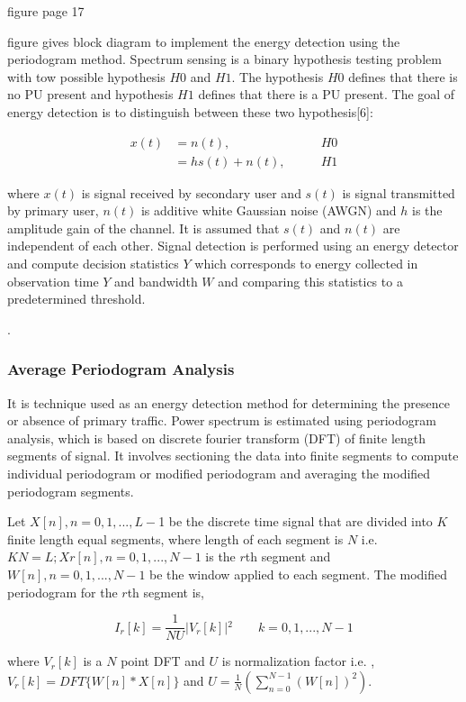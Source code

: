 figure page 17




figure gives block diagram to implement the energy detection using the periodogram method. Spectrum sensing is a binary hypothesis testing problem with tow possible hypothesis $H0$ and $H1$. The hypothesis $H0$ defines that there is no PU present and hypothesis $H1$ defines that there is a PU present. The goal of energy detection is to distinguish between these two hypothesis[6]:

\begin{align}
	x(t) &= n(t), \qquad & H0 \nonumber\\
		&= h s(t)+n(t), \qquad & H1 \nonumber
\end{align}

where $x(t)$ is signal received by secondary user and $s(t)$ is signal transmitted by primary user, $n(t)$ is additive white Gaussian noise (AWGN) and $h$ is the amplitude gain of the channel. It is assumed that $s(t)$  and $n(t)$ are independent of each other. Signal detection is performed using an energy detector and compute decision statistics $Y$ which corresponds to energy collected in observation time $Y$ and bandwidth $W$ and comparing this statistics to a predetermined threshold. 

.
\subsubsection{Average Periodogram Analysis}
 It is technique used as an energy detection method for determining the presence or absence of primary traffic. 
Power spectrum is estimated using periodogram analysis, which is based on discrete fourier transform (DFT) of finite length segments of signal. It involves sectioning the data into finite segments to compute individual periodogram or modified periodogram and averaging the modified periodogram segments.


Let $X[n], n=0,1,...,L-$1 be the discrete time signal that are divided into $K$ finite length equal segments, where length of each segment is $N$ i.e. $KN = L; Xr[n], n= 0,1,..., N-1$ is the $r$th segment and $W[n], n=0,1,...,N-1$ be the window applied to each segment. The modified periodogram for the $r$th segment is,

\begin{equation*}
	I_{r}[k] = \frac{1}{NU}\vert{}V_{r}[k]\vert{}^2     \qquad k=0,1,...,N-1
\end{equation*}

where $V_{r}[k]$ is a $N$ point DFT and $U$ is normalization factor i.e. ,
$V_{r}[k] = DFT\{W[n]*X[n]\}$  and 
$U = \frac{1}{N}(\sum_{n=0}^{N-1}(W[n])^2)$.


